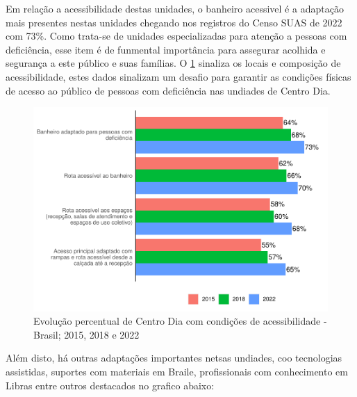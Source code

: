 \documentclass[
  brazilian]{report}
\begin{document}
Em relação a acessibilidade destas unidades, o banheiro acessivel é a
adaptação mais presentes nestas unidades chegando nos registros do Censo
SUAS de 2022 com 73\%. Como trata-se de unidades especializadas para
atenção a pessoas com deficiência, esse item é de funmental importância
para assegurar acolhida e segurança a este público e suas famílias. O
\cref{fig:cdia-acessibilidade} sinaliza os locais e composição de
acessibilidade, estes dados sinalizam um desafio para garantir as
condições físicas de acesso ao público de pessoas com deficiência nas
undiades de Centro Dia.

\begin{figure}
\includegraphics{Censo-SUAS-2022_files/figure-latex/cdia-acessibilidade-1} \caption[Evolução percentual de Centro Dia com condições de acessibilidade - Brasil]{Evolução percentual de Centro Dia com condições de acessibilidade - Brasil; 2015, 2018 e 2022}\label{fig:cdia-acessibilidade}
\end{figure}

Além disto, há outras adaptações importantes netsas undiades, coo
tecnologias assistidas, suportes com materiais em Braile, profissionais
com conhecimento em Libras entre outros destacados no grafico abaixo:
\end{document}
